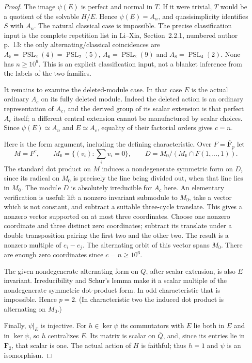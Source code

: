 \begin{proof}
The image $\psi(E)$ is perfect and normal in $T$.  If it were
trivial, $T$ would be a quotient of the solvable $H/E$.
Hence $\psi(E)=A_n$, and quasisimplicity identifies $S$ with
$A_n$.  The natural classical case is impossible.  The precise
classification input is the complete repetition list in
Li--Xia, Section~2.2.1, numbered author p.~13: the only
alternating/classical coincidences are
$A_5=\operatorname{PSL}_2(4)=\operatorname{PSL}_2(5)$,
$A_6=\operatorname{PSL}_2(9)$ and
$A_8=\operatorname{PSL}_4(2)$.\cite{HES:LiXia2022}
None has $n\ge10^6$.  This is an explicit classification input,
not a blanket inference from the labels of the two families.

It remains to examine the deleted-module case.  In that case
$E$ is the actual ordinary $A_c$ on its fully deleted module.
Indeed the deleted action is an ordinary representation of
$A_c$, and the derived group of its scalar extension is that
perfect $A_c$ itself; a different central extension cannot be
manufactured by scalar choices.  Since $\psi(E)\simeq A_n$
and $E\simeq A_c$, equality of their factorial orders gives
$c=n$.

Here is the form argument, including the defining characteristic.
Over $F=\overline{\mathbf F}_p$ let
\[
 M=F^c,\qquad M_0=\{(v_i):\sum_i v_i=0\},\qquad
 D=M_0/(M_0\cap F(1,\ldots,1)).
 \tag{GHC.11}
\]
The standard dot product on $M$ induces a nondegenerate symmetric
form on $D$, since its radical on $M_0$ is precisely the line
being divided out, when that line lies in $M_0$.
The module $D$ is absolutely irreducible for $A_c$ here.  An
elementary verification is useful: lift a nonzero invariant
submodule to $M_0$, take a vector which is not constant, and
subtract a suitable three-cycle translate.  This gives a nonzero
vector supported on at most three coordinates.  Choose one
nonzero coordinate and three distinct zero coordinates; subtract
its translate under a double transposition pairing the first
two and the other two.  The result is a nonzero multiple of
$e_i-e_j$.  The alternating orbit of this vector spans $M_0$.
There are enough zero coordinates since $c=n\ge10^6$.

The given nondegenerate alternating form on $Q$, after scalar
extension, is also $E$-invariant.  Irreducibility and Schur's
lemma make it a scalar multiple of the nondegenerate symmetric
dot-product form.  In odd characteristic that is impossible.
Hence $p=2$.  (In characteristic two the induced dot product
is alternating on $M_0$.)

Finally, $\psi|_E$ is injective.  For $h\in\ker\psi$ its
commutators with $E$ lie both in $E$ and in $\ker\psi$, so
$h$ centralizes $E$.  Its matrix is scalar on $\overline Q$,
and, since its entries lie in $\mathbf F_2$, that scalar is one.
The actual action of $H$ is faithful; thus $h=1$ and
\(\psi\) is an isomorphism.


\end{proof}
